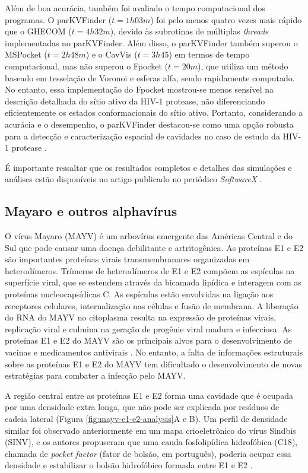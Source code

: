 \documentclass[Portugues]{phdquali}
\begin{document}
Além de boa acurácia, também foi avaliado o tempo computacional dos programas. O parKVFinder ($t = 1h03m$) foi pelo menos quatro vezes mais rápido que o GHECOM ($t = 4h32m$), devido às subrotinas de múltiplas \textit{threads} implementadas no parKVFinder. Além disso, o parKVFinder também superou o MSPocket ($t = 2h48m$) e o CavVis ($t = 3h45$) em termos de tempo computacional, mas não superou o Fpocket ($t = 20m$), que utiliza um método baseado em tesselação de Voronoi e esferas alfa, sendo rapidamente computado. No entanto, essa implementação do Fpocket mostrou-se menos sensível na descrição detalhada do sítio ativo da HIV-1 protease, não diferenciando eficientemente os estados conformacionais do sítio ativo. Portanto, considerando a acurácia e o desempenho, o parKVFinder destacou-se como uma opção robusta para a detecção e caracterização espacial de cavidades no caso de estudo da HIV-1 protease \cite{guerra2020}.

É importante ressaltar que os resultados completos e detalhes das simulações e análises estão disponíveis no artigo publicado no periódico \textit{SoftwareX} \cite{guerra2020}.

\subsection{Mayaro e outros alphavírus}

O vírus Mayaro (MAYV) é um arbovírus emergente das Américas Central e do Sul que pode causar uma doença debilitante e artritogênica. As proteínas E1 e E2 são importantes proteínas virais transmembranares organizadas em heterodímeros. Trímeros de heterodímeros de E1 e E2 compõem as espículas na superfície viral, que se estendem através da bicamada lipídica e interagem com as proteínas nucleocapsídicas C. As espículas estão envolvidas na ligação aos receptores celulares, internalização nas células e fusão de membrana. A liberação do RNA do MAYV no citoplasma resulta na expressão de proteínas virais, replicação viral e culmina na geração de progênie viral madura e infecciosa. As proteínas E1 e E2 do MAYV são os principais alvos para o desenvolvimento de vacinas e medicamentos antivirais \cite{ribeiro2021}. No entanto, a falta de informações estruturais sobre as proteínas E1 e E2 do MAYV tem dificultado o desenvolvimento de novas estratégias para combater a infecção pelo MAYV.

A região central entre as proteínas E1 e E2 forma uma cavidade que é ocupada por uma densidade extra longa, que não pode ser explicada por resíduos de cadeia lateral (Figura \ref{fig:mayv-e1-e2-analysis}A e B). Um perfil de densidade similar foi observado anteriormente em um mapa crioeletrônico do vírus Sindbis (SINV), e os autores propuseram que uma cauda fosfolipídica hidrofóbica (C18), chamada de \textit{pocket factor} (fator de bolsão, em português), poderia ocupar essa densidade e estabilizar o bolsão hidrofóbico formada entre E1 e E2 \cite{chen2018}.
\end{document}
